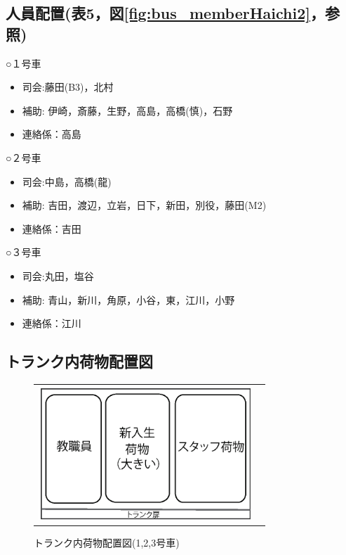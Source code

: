 \subsection{人員配置(表5，図\ref{fig:bus_memberHaichi2}，参照)}
○１号車
\begin{itemize}
\item 司会:藤田(B3)，北村
\item 補助: 伊崎，斎藤，生野，高島，高橋(慎)，石野
\item 連絡係：高島
\end{itemize}
○２号車
\begin{itemize}
\item 司会:中島，高橋(龍)
\item 補助: 吉田，渡辺，立岩，日下，新田，別役，藤田(M2)
\item 連絡係：吉田
\end{itemize}

\newpage

○３号車
\begin{itemize}
\item 司会:丸田，塩谷
\item 補助: 青山，新川，角原，小谷，東，江川，小野
\item 連絡係：江川
\end{itemize}


\subsection{トランク内荷物配置図}
\begin{figure}[H]
\begin{tabular}{lr}
\begin{minipage}{1.0\textwidth}
  \begin{center}
  \includegraphics[width=8cm]{./06/baggage_place_1.eps}
  \caption{トランク内荷物配置図(1,2,3号車)}
  \end{center}
\end{minipage}
\end{tabular}
\end{figure}

